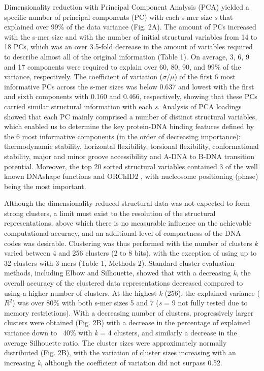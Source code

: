 \documentclass[sigconf]{acmart}
\begin{document}
Dimensionality reduction with Principal Component Analysis (PCA) yielded a specific number of principal components (PC) with each s-mer size \textit{s} that explained over 99\% of the data variance (Fig. 2A). The amount of PCs increased with the s-mer size and with the number of initial structural variables from 14 to 18 PCs, which was an over 3.5-fold decrease in the amount of variables required to describe almost all of the original information (Table 1). On average, 3, 6, 9 and 17 components were required to explain over 60, 80, 90, and 99\% of the variance, respectively. The coefficient of variation (\(\sigma/\mu\)) of the first 6 most informative PCs across the s-mer sizes was below 0.637 and lowest with the first and sixth components with 0.160 and 0.466, respectively, showing that these PCs carried similar structural information with each \textit{s}. Analysis of PCA loadings showed that each PC mainly comprised a number of distinct structural variables, which enabled us to determine the key protein-DNA binding features defined by the 6 most informative components (in the order of decreasing importance): thermodynamic stability, horizontal flexibility, torsional flexibility, conformational stability, major and minor groove accessibility and A-DNA to B-DNA transition potential. Moreover, the top 20 sorted structural variables contained 3 of the well known DNAshape functions \cite{Rohs2009-hm} and ORChID2 \cite{Bishop2011-jm}, with nucleosome positioning (phase) \cite{Satchwell1986-me} being the most important.

Although the dimensionality reduced structural data was not expected to form strong clusters, a limit must exist to the resolution of the structural representations, above which there is no measurable influence on the achievable computational accuracy, and an additional level of compactness of the DNA codes was desirable. Clustering was thus performed with the number of clusters \textit{k} varied between 4 and 256 clusters (2 to 8 bits), with the exception of using up to 32 clusters with 3-mers (Table 1, Methods 2). Standard cluster evaluation methods, including Elbow and Silhouette, showed that with a decreasing \textit{k}, the overall accuracy of the clustered data representations decreased compared to using a higher number of clusters. At the highest \textit{k} (256), the explained variance ($R^2$) was over 80\% with both s-mer sizes 5 and 7 (\textit{s} = 9 not fully tested due to memory restrictions). With a decreasing number of clusters, progressively larger clusters were obtained (Fig. 2B) with a decrease in the percentage of explained variance down to ~40\% with \textit{k} = 4 clusters, and similarly a decrease in the average Silhouette ratio. The cluster sizes were approximately normally distributed (Fig. 2B), with the variation of cluster sizes increasing with an increasing \textit{k},  although the coefficient of variation did not surpass 0.52.
\end{document}
